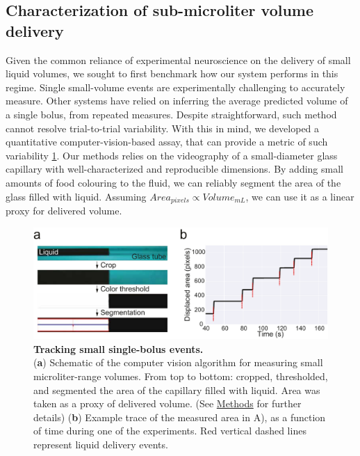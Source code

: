 \subsection*{Characterization of sub-microliter volume delivery}

Given the common reliance of experimental neuroscience on the delivery of small liquid volumes, we sought to first benchmark how our system performs in this regime. Single small-volume events are experimentally challenging to accurately measure. Other systems have relied on inferring the average predicted volume of a single bolus, from repeated measures. Despite straightforward, such method cannot resolve trial-to-trial variability. With this in mind, we developed a quantitative computer-vision-based assay, that can provide a metric of such variability \cref{fig:PumpProtocol}. Our methods relies on the videography of a small-diameter glass capillary with well-characterized and reproducible dimensions. By adding small amounts of food colouring to the fluid, we can reliably segment the area of the glass filled with liquid. Assuming $Area_{pixels} \propto Volume_{mL}$, we can use it as a linear proxy for delivered volume. 

\begin{figure} 
	\centering
	\includegraphics[width=1.0\linewidth]{Figures/Artboard 1_1.pdf}
	\caption{\textbf{Tracking small single-bolus events.}\\
		(\textbf{a}) Schematic of the computer vision algorithm for measuring small microliter-range volumes. From top to bottom: cropped, thresholded, and segmented the area of the capillary filled with liquid. Area was taken as a proxy of delivered volume. (See \hyperref[s:methods]{Methods} for further details)  (\textbf{b}) Example trace of the measured area in A), as a function of time during one of the experiments. Red vertical dashed lines represent liquid delivery events.}
	\label{fig:PumpProtocol}  
\end{figure}


